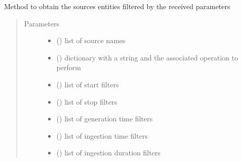 \begin{fulllineitems}

\begin{fulllineitems}
\label{\detokenize{eboa.engine:eboa.engine.query.Query.get_sources}}
Method to obtain the sources entities filtered by the received parameters
\begin{quote}\begin{description}
\item[{Parameters}] \leavevmode\begin{itemize}
\item {} 
 () \textendash{} list of source names

\item {} 
 () \textendash{} dictionary with a string and the associated operation to perform

\item {} 
 () \textendash{} list of start filters

\item {} 
 () \textendash{} list of stop filters

\item {} 
 () \textendash{} list of generation time filters

\item {} 
 () \textendash{} list of ingestion time filters

\item {} 
 () \textendash{} list of ingestion duration filters


\end{itemize}
\end{description}
\end{quote}
\end{fulllineitems}
\end{fulllineitems}
